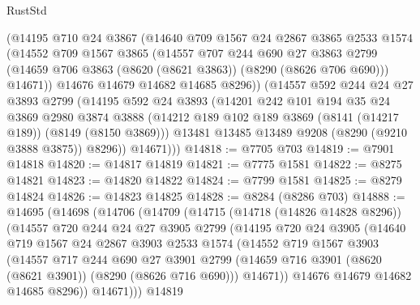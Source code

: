 \begin{lexlean}{RustStd}
\begin{coremodule}
        (@14195
          @710
          @24
          @3867
          (@14640
            @709
            @1567
            @24
            @2867
            @3865
            @2533
            @1574
            (@14552
              @709
              @1567
              @3865
              (@14557
                @707
                @244
                @690
                @27
                @3863
                @2799
                (@14659 @706 @3863 (@8620 (@8621 @3863)) (@8290 (@8626 @706 @690)))
                @14671))
            @14676
            @14679
            @14682
            @14685
            @8296))
        (@14557
          @592
          @244
          @24
          @27
          @3893
          @2799
          (@14195
            @592
            @24
            @3893
            (@14201
              @242
              @101
              @194
              @35
              @24
              @3869
              @2980
              @3874
              @3888
              (@14212 @189 @102 @189 @3869 (@8141 (@14217 @189)) (@8149 (@8150 @3869)))
              @13481
              @13485
              @13489
              @9208
              (@8290 (@9210 @3888 @3875))
              @8296))
          @14671)))
@14818 := @7705 @703
@14819 := @7901 @14818
@14820 := @14817 @14819
@14821 := @7775 @1581
@14822 := @8275 @14821
@14823 := @14820 @14822
@14824 := @7799 @1581
@14825 := @8279 @14824
@14826 := @14823 @14825
@14828 := @8284 (@8286 @703)
@14888 := @14695
    (@14698
      (@14706
        (@14709
          (@14715
            (@14718 (@14826 @14828 @8296))
            (@14557
              @720
              @244
              @24
              @27
              @3905
              @2799
              (@14195
                @720
                @24
                @3905
                (@14640
                  @719
                  @1567
                  @24
                  @2867
                  @3903
                  @2533
                  @1574
                  (@14552
                    @719
                    @1567
                    @3903
                    (@14557
                      @717
                      @244
                      @690
                      @27
                      @3901
                      @2799
                      (@14659 @716 @3901 (@8620 (@8621 @3901)) (@8290 (@8626 @716 @690)))
                      @14671))
                  @14676
                  @14679
                  @14682
                  @14685
                  @8296))
              @14671)))
        @14819

\end{coremodule}
\end{lexlean}
